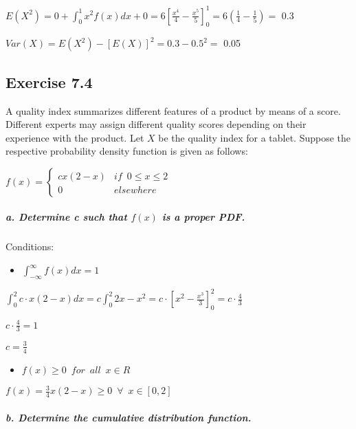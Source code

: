 \documentclass[
]{article}
\providecommand{\tightlist}{%
  \setlength{\itemsep}{0pt}\setlength{\parskip}{0pt}}
\begin{document}
\(E(X^2) = \displaystyle 0 + \int_0^1x^2f(x)dx + 0 = 6\left[ \frac{x^4}{4} - \frac{x^5}{5} \right]^1_0 = 6\left( \frac{1}{4} - \frac{1}{5} \right) =\)
0.3

\(Var(X) = E(X^2) - [E(X)]^2 =0.3 - 0.5^2 =\) 0.05

\hypertarget{exercise-7.4}{%
\subsection{Exercise 7.4}\label{exercise-7.4}}

A quality index summarizes different features of a product by means of a
score. Different experts may assign different quality scores depending
on their experience with the product. Let \(X\) be the quality index for
a tablet. Suppose the respective probability density function is given
as follows:

\(f(x) = \left\{ \begin{array}{ll} cx(2-x) & if \enspace 0 \leq x \leq 2 \\ 0 & elsewhere \end{array} \right.\)

\hypertarget{a.-determine-c-such-that-fx-is-a-proper-pdf.}{%
\subparagraph{\texorpdfstring{a. Determine c such that \(f(x)\) is a
proper
PDF.}{a. Determine c such that f(x) is a proper PDF.}}\label{a.-determine-c-such-that-fx-is-a-proper-pdf.}}

Conditions:

\begin{itemize}
\tightlist
\item
  \(\int_{-\infty}^\infty f(x)dx = 1\)
\end{itemize}

\(\displaystyle \int_0^2 c \cdot x(2-x) dx = c \int_0^2 2x - x^2 = c \cdot \left[ x^2 - \frac{x^3}{3} \right]_0^2 = c \cdot \frac{4}{3}\)

\(c \cdot \frac{4}{3} = 1\)

\(c = \frac{3}{4}\)

\begin{itemize}
\tightlist
\item
  \(f(x) \geq 0 \enspace for \enspace all \enspace x \in R\)
\end{itemize}

\(f(x) = \frac{3}{4} x(2-x) \geq 0 \enspace \forall \enspace x \in [0, 2]\)

\hypertarget{b.-determine-the-cumulative-distribution-function.}{%
\subparagraph{b. Determine the cumulative distribution
function.}\label{b.-determine-the-cumulative-distribution-function.}}
\end{document}
